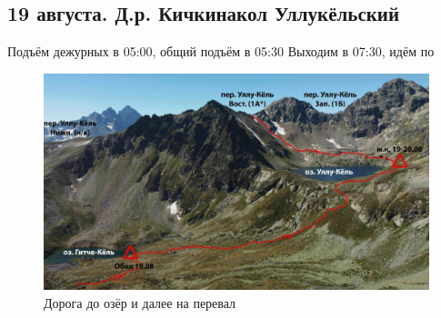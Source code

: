 \subsection{19 августа. Д.р. Кичкинакол Уллукёльский}

Подъём дежурных в 05:00, общий подъём в 05:30 
Выходим в 07:30, идём по 



\begin{figure}[h]
	\centering
	\includegraphics[width=0.7\linewidth]{../pics/ullu_kuel_route}
	\caption{Дорога до озёр и далее на перевал}
	\label{fig:ullu_kuel_route}
\end{figure}
\newpage